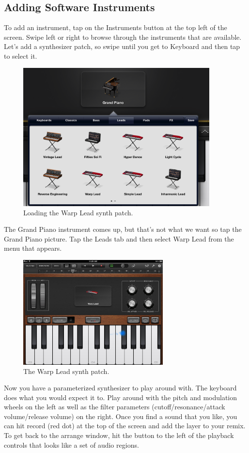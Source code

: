 \documentclass[12pt]{article}
\begin{document}
\subsection{Adding Software Instruments}
To add an instrument, tap on the Instruments button at the top left of the screen. Swipe left or right to browse through the instruments that are available. Let's add a synthesizer patch, so swipe until you get to Keyboard and then tap to select it. 
\begin{figure}[h]
   \centering
   \includegraphics[width=4in]{fig/inst1.png}
   \caption*{Loading the Warp Lead synth patch.}
\end{figure}
The Grand Piano instrument comes up, but that's not what we want so tap the Grand Piano picture. Tap the Leads tab and then select Warp Lead from the menu that appears.
\begin{figure}[b!]
   \centering
   \includegraphics[width=3in]{fig/inst2.png}
   \caption*{The Warp Lead synth patch.}
\end{figure}
Now you have a parameterized synthesizer to play around with. The keyboard does what you would expect it to. Play around with the pitch and modulation wheels on the left as well as the filter parameters (cutoff/resonance/attack volume/release volume) on the right. Once you find a sound that you like, you can hit record (red dot) at the top of the screen and add the layer to your remix. To get back to the arrange window, hit the button to the left of the playback controls that looks like a set of audio regions.
\end{document}

